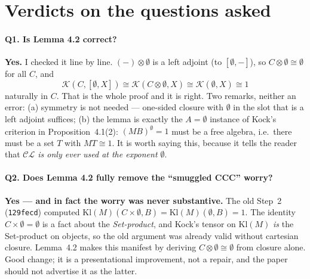 \documentclass[11pt]{article}
\newcommand{\Kl}{\mathrm{Kl}}
\newcommand{\CL}{\mathcal{CL}}
\begin{document}
\section*{Verdicts on the questions asked}

\paragraph{Q1. Is Lemma 4.2 correct?} \textbf{Yes.} I checked it line by line.
$(-)\otimes\emptyset$ is a left adjoint (to $[\emptyset,-]$), so $C\otimes\emptyset\cong\emptyset$ for all $C$,
and
\[
\mathcal K(C,[\emptyset,X])\cong\mathcal K(C\otimes\emptyset,X)\cong\mathcal K(\emptyset,X)\cong 1
\]
naturally in $C$. That is the whole proof and it is right. Two remarks, neither an error:
(a) symmetry is not needed --- one-sided closure with $\emptyset$ in the slot that
is a left adjoint suffices; (b) the lemma is exactly the $A=\emptyset$ instance of
Kock's criterion in Proposition~4.1(2): $(MB)^{\emptyset}=1$ must be a free algebra,
i.e.\ there must be a set $T$ with $MT\cong1$. It is worth saying this, because
it tells the reader that \emph{$\CL$ is only ever used at the exponent $\emptyset$}.

\paragraph{Q2. Does Lemma 4.2 fully remove the ``smuggled CCC'' worry?} \textbf{Yes
--- and in fact the worry was never substantive.} The old Step~2 (\texttt{129fecd})
computed $\Kl(M)(C\times\emptyset,B)=\Kl(M)(\emptyset,B)=1$. The identity
$C\times\emptyset=\emptyset$ is a fact about the \emph{Set-product}, and Kock's tensor on
$\Kl(M)$ \emph{is} the Set-product on objects, so the old argument was already
valid without cartesian closure. Lemma~4.2 makes this manifest by deriving
$C\otimes\emptyset\cong\emptyset$ from closure alone. Good change; it is a presentational
improvement, not a repair, and the paper should not advertise it as the latter.
\end{document}
